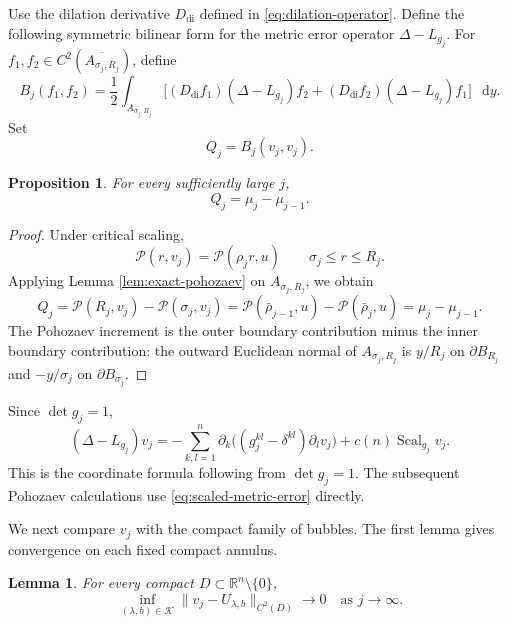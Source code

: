\documentclass[11pt]{article}
\numberwithin{equation}{section}
\newtheorem{proposition}[theorem]{Proposition}
\newtheorem{lemma}[theorem]{Lemma}
\theoremstyle{remark}
\newcommand{\R}{\mathbb R}
\newcommand{\cP}{\mathcal P}
\newcommand{\norm}[1]{\lVert #1\rVert}
\newcommand{\dd}{\mathop{}\!\mathrm{d}}
\begin{document}
Use the dilation derivative \(D_{\mathrm{di}}\) defined in
\eqref{eq:dilation-operator}.
Define the following symmetric bilinear form for the metric error operator
\(\Delta-L_{g_j}\).
For \(f_1,f_2\in C^2(\overline{A_{\sigma_j,R_j}})\), define
 {
\begin{equation}\label{eq:symmetric-dilation-form}
  B_j(f_1,f_2)=\frac12\int_{A_{\sigma_j,R_j}}\bigl[
 (D_{\mathrm{di}}f_1)(\Delta-L_{g_j})f_2
 {}+(D_{\mathrm{di}}f_2)(\Delta-L_{g_j})f_1\bigr]\,\dd y.
\end{equation}
}
Set
 {
\begin{equation}\label{eq:Qj-definition}
 Q_j= B_j(v_j,v_j).
\end{equation}
}

\par
\begin{proposition}\label{prop:annular-increment}
For every sufficiently large \(j\),
\begin{equation}\label{eq:exact-Qj-increment}
 Q_j=\mu_j-\mu_{j-1}.
\end{equation}
\end{proposition}

\par
\begin{proof}
{Under critical scaling,}
\[
 \cP(r,v_j)=\cP(\rho_jr,u)
 \qquad \sigma_j\le r\le R_j.
\]
{Applying Lemma  \ref{lem:exact-pohozaev} on
\(A_{\sigma_j,R_j}\), we obtain}
 {
\[
 Q_j
 =\cP(R_j,v_j)-\cP(\sigma_j,v_j)
 =\cP(\bar\rho_{j-1},u)-\cP(\bar\rho_j,u)
 =\mu_j-\mu_{j-1}.
\]
}
The Pohozaev increment is the outer boundary contribution minus the inner boundary
contribution: the outward
Euclidean normal of \(A_{\sigma_j,R_j}\) is \(y/R_j\) on
\(\partial B_{R_j}\) and \(-y/\sigma_j\) on
\(\partial B_{\sigma_j}\).
\end{proof}

\par
Since \(\det g_j=1\),
\begin{equation}\label{eq:scaled-metric-error}
 (\Delta-L_{g_j})v_j
 =-\sum_{k,l=1}^n
 \partial_k\bigl((g_j^{kl}-\delta^{kl})\partial_lv_j\bigr)
 +c(n)\operatorname{Scal}_{g_j}v_j.
\end{equation}
This is the coordinate formula following from \(\det g_j=1\).
The subsequent Pohozaev calculations use
\eqref{eq:scaled-metric-error} directly.


 We next compare \(v_j\) with the compact family of bubbles. The first lemma gives convergence on each fixed compact annulus.

\par
\begin{lemma}\label{lem:distance-to-bubble-family}
For every compact \(D\subset\R^n\setminus\{0\}\),
\[
 \inf_{(\lambda,b)\in\mathcal K}
 \norm{v_j-U_{\lambda,b}}_{C^2(D)}\to0
 \quad\text{as }j\to\infty.
\]
\end{lemma}
\end{document}
